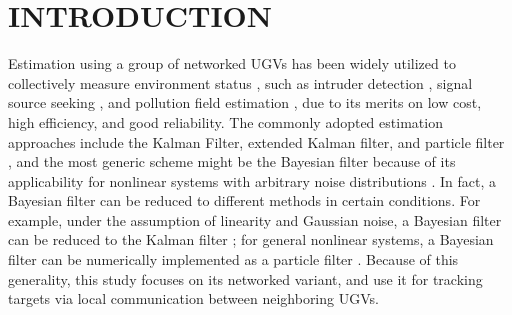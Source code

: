\section{INTRODUCTION}
	
	Estimation using a group of networked UGVs has been widely utilized to collectively measure environment status \cite{hedrick2011tools}, such as intruder detection \cite{chamberland2007wireless}, signal source seeking \cite{atanasov2015distributed}, and pollution field estimation \cite{madhag2017distributed},
	due to its merits on low cost, high efficiency, and good reliability.
	The commonly adopted estimation approaches include the Kalman Filter, extended Kalman filter, and particle filter \cite{thrun2005probabilistic}, and
	the most generic scheme might be the Bayesian filter because of its applicability for nonlinear systems with arbitrary noise distributions \cite{bandyopadhyay2014distributed,julian2012distributed}.
	In fact, a Bayesian filter can be reduced to different methods in certain conditions.
	For example, under the assumption of linearity and Gaussian noise, a Bayesian filter can be reduced to the Kalman filter \cite{chen2003bayesian}; 
	\textcolor{\revcol}{for general nonlinear systems, a Bayesian filter can be numerically implemented as a particle filter \cite{chen2003bayesian}}.
	Because of this generality, this study focuses on its networked variant, \textcolor{\revcol}{and use it for tracking targets via local communication between neighboring UGVs.} %
	
